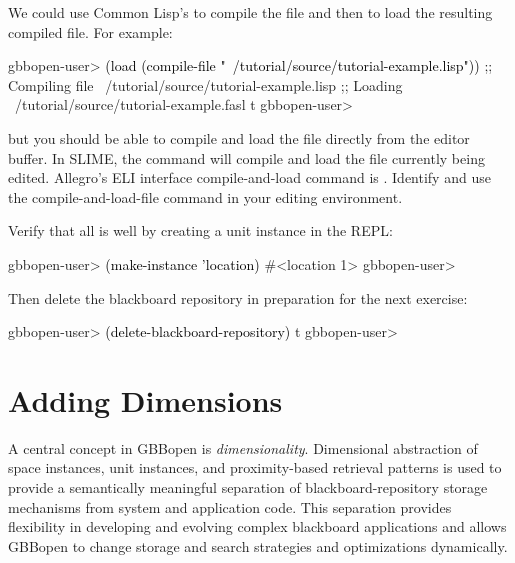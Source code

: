 \documentclass[10pt,twoside,english,pdftex]{article}
\begin{document}
We could use Common Lisp's  to compile the file and
then  to load the resulting compiled file. For example:
%
\W\supp
\begin{smallexample}
\textcolor{darkergray}{%
  gbbopen-user> \textcolor{black}{(load (compile-file "~/tutorial/source/tutorial-example.lisp"))}
  ;; Compiling file ~/tutorial/source/tutorial-example.lisp
  ;; Loading ~/tutorial/source/tutorial-example.fasl
  t
  gbbopen-user>}
\end{smallexample}
%
but you should be able to compile and load the file directly from the editor
buffer.  In SLIME, the command  will compile and load the
file currently being edited.  Allegro's ELI interface compile-and-load command
is .  Identify and use the compile-and-load-file command
in your editing environment.

Verify that all is well by creating a  unit instance in
the REPL:
%
\W\supp
\begin{example}
\textcolor{darkergray}{%
  gbbopen-user> \textcolor{black}{(make-instance 'location)}
  #<location 1>
  gbbopen-user>}
\end{example}

%
Then delete the blackboard repository in preparation for the next exercise:
%
\W\supp
\begin{example}
\textcolor{darkergray}{%
  gbbopen-user> \textcolor{black}{(delete-blackboard-repository)}
  t
  gbbopen-user>}
\end{example}


\T\markright{}%
\T\pagestyle{plain}
\T\cleardoublepage
\W{}
\T\pagestyle{fancy}
\T\thispagestyle{fancybottom}
\T\renewcommand{\headrulewidth}{0pt}
\section{Adding Dimensions}
\label{sec:dimensions}%

A central concept in GBBopen is \textit{dimensionality}.  Dimensional
abstraction of space instances, unit instances, and proximity-based
retrieval patterns is used to provide a semantically meaningful
separation of blackboard-repository storage mechanisms from system and
application code.  This separation provides flexibility in developing
and evolving complex blackboard applications and allows GBBopen to
change storage and search strategies and optimizations dynamically.
\end{document}
